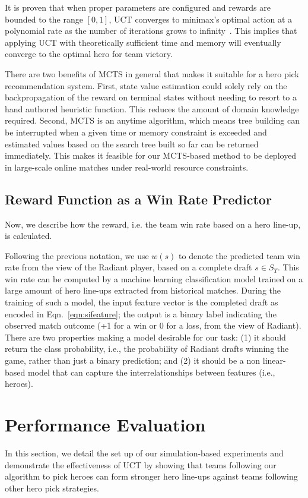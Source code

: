 It is proven that when proper parameters are configured and rewards are bounded to the range $[0,1]$, UCT converges to minimax's optimal action at a polynomial rate as the number of iterations grows to infinity~\cite{kocsis2006bandit}. This implies that applying UCT with theoretically sufficient time and memory will eventually converge to the optimal hero for team victory. 

There are two benefits of MCTS in general that makes it suitable for a hero pick recommendation system. First, state value estimation could solely rely on the backpropagation of the reward on terminal states without needing to resort to a hand authored heuristic function. This reduces the amount of domain knowledge required. Second, MCTS is an anytime algorithm, which means tree building can be interrupted when a given time or memory constraint is exceeded and estimated values based on the search tree built so far can be returned immediately. This makes it feasible for our MCTS-based method to be deployed in large-scale online matches under real-world resource constraints.

\subsection{Reward Function as a Win Rate Predictor}\label{sec:rewardfunction}
Now, we describe how the reward, i.e. the team win rate based on a hero line-up, is calculated. 

Following the previous notation, we use $w(s)$ to denote the predicted team win rate from the view of the Radiant player, based on a complete draft $s \in S_T$. This win rate can be computed by a machine learning classification model trained on a large amount of hero line-ups extracted from historical matches. During the training of such a model, the input feature vector is the completed draft as encoded in Eqn.~\ref{eqn:sifeature}; the output is a binary label indicating the observed match outcome (+1 for a win or 0 for a loss, from the view of Radiant). There are two properties making a model desirable for our task: (1) it should return the class probability, i.e., the probability of Radiant drafts winning the game, rather than just a binary prediction; and (2) it should be a non linear-based model that can capture the interrelationships between features (i.e., heroes). 


\section{Performance Evaluation}\label{ressection}
In this section, we detail the set up of our simulation-based experiments and demonstrate the effectiveness of UCT by showing that teams following our algorithm to pick heroes can form stronger hero line-ups against teams following other hero pick strategies.

